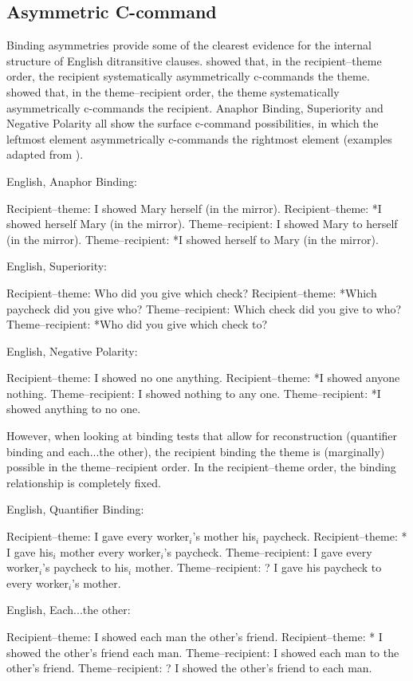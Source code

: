 	\subsection{Asymmetric C-command}
	Binding asymmetries provide some of the clearest evidence for the internal structure of English ditransitive clauses. \cite{Barss.1986} showed that, in the recipient--theme order, the recipient systematically asymmetrically c-commands the theme. \cite{Aoun.1989} showed that, in the theme--recipient order, the theme systematically asymmetrically c-commands the recipient.  Anaphor Binding, Superiority and Negative Polarity all show the surface c-command possibilities, in which the leftmost element asymmetrically c-commands the rightmost element (examples adapted from \cite{Aoun.1989}).
\begin{exe}
\ex English, Anaphor Binding:
\begin{xlist}
\ex Recipient--theme: I showed Mary herself (in the mirror).
\ex Recipient--theme: *I showed herself Mary (in the mirror).
\ex Theme--recipient: I showed Mary to herself (in the mirror).
\ex Theme--recipient: *I showed herself to Mary (in the mirror).
\end{xlist}
\ex English, Superiority:
\begin{xlist}
\ex Recipient--theme: Who did you give which check?
\ex Recipient--theme: *Which paycheck did you give who?
\ex Theme--recipient: Which check did you give to who?
\ex Theme--recipient: *Who did you give which check to?
\end{xlist}
\ex English, Negative Polarity:
\begin{xlist}
\ex Recipient--theme: I showed no one anything.
\ex Recipient--theme: *I showed anyone nothing.
\ex Theme--recipient: I showed nothing to any one.
\ex Theme--recipient: *I showed anything to no one.
\end{xlist}
\end{exe}

However, when looking at binding tests that allow for reconstruction (quantifier binding and each...the other), the recipient binding the theme is (marginally) possible in the theme--recipient order. In the recipient--theme order, the binding relationship is completely fixed. 

\begin{exe}
\ex English, Quantifier Binding:
\begin{xlist}
\ex Recipient--theme: I gave every worker$_i$'s mother his$_i$ paycheck.
\ex Recipient--theme: * I gave his$_i$ mother every worker$_i$'s paycheck.
\ex Theme--recipient: I gave every worker$_i$'s paycheck to his$_i$ mother.
\ex Theme--recipient: ? I gave his paycheck to every worker$_i$'s mother.
\end{xlist}

\ex English, Each...the other:
\begin{xlist}
\ex Recipient--theme: I showed each man the other's friend.
\ex Recipient--theme: * I showed the other's friend each man.
\ex Theme--recipient: I showed each man to the other's friend.
\ex Theme--recipient: ? I showed the other's friend to each man.
\end{xlist}
\end{exe}

